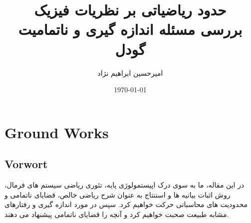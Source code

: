 \documentclass[10pt,a4paper]{article}
\title{حدود ریاضیاتی بر نظریات فیزیک
\\ \large بررسی مسئله اندازه گیری و ناتمامیت گودل}
\author{امیرحسین ابراهیم نژاد}
\date{\today}
\begin{document}
        \maketitle
        \tableofcontents
        \newpage
        \section{Ground Works}
        \subsection{Vorwort}
         در این مقاله، ما به سوی درک اپیستمولوژی پایه، تئوری ریاضی سیستم های فرمال، روش اثبات بیانیه ها و استنتاج به عنوان شرح ریاضی خالص، قضایای ناتمامی و محدودیت های محاسباتی حرکت خواهیم کرد. سپس در مورد اندازه گیری و رفتارهای مشابه طبیعت صحبت خواهیم کرد و آنچه را قضایای ناتمامی پیشنهاد می دهند.
\end{document}
